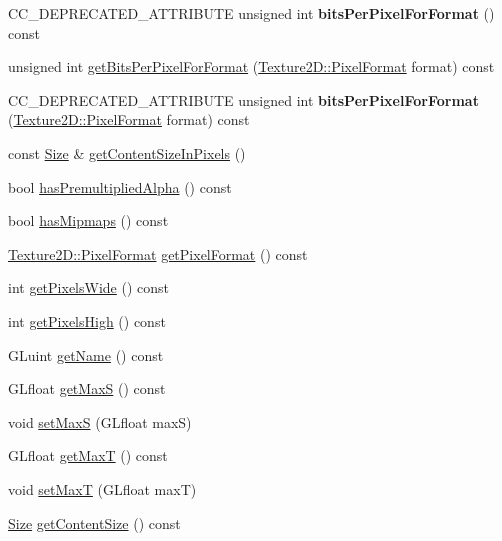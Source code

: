 \begin{DoxyCompactItemize}
C\+C\+\_\+\+D\+E\+P\+R\+E\+C\+A\+T\+E\+D\+\_\+\+A\+T\+T\+R\+I\+B\+U\+TE unsigned int {\bfseries bits\+Per\+Pixel\+For\+Format} () const
\item 
unsigned int \hyperlink{classTexture2D_ada259b363b6d48c23acfcc79db3d2a47}{get\+Bits\+Per\+Pixel\+For\+Format} (\hyperlink{classTexture2D_a45d9d8bb5a0669def36bbdfbfb91d220}{Texture2\+D\+::\+Pixel\+Format} format) const
\item 
\mbox{\label{classTexture2D_afe02fb3ca232889c58339125bf2e2e8e}} 
C\+C\+\_\+\+D\+E\+P\+R\+E\+C\+A\+T\+E\+D\+\_\+\+A\+T\+T\+R\+I\+B\+U\+TE unsigned int {\bfseries bits\+Per\+Pixel\+For\+Format} (\hyperlink{classTexture2D_a45d9d8bb5a0669def36bbdfbfb91d220}{Texture2\+D\+::\+Pixel\+Format} format) const
\item 
const \hyperlink{classSize}{Size} \& \hyperlink{classTexture2D_a827e7f2d58de577a63e62d3ed4f488cd}{get\+Content\+Size\+In\+Pixels} ()
\item 
bool \hyperlink{classTexture2D_aa1cc09ea8b7015cc2bf66a7847ee0990}{has\+Premultiplied\+Alpha} () const
\item 
bool \hyperlink{classTexture2D_a5a19e34a8e9f9192f81193f7bf8cdbc2}{has\+Mipmaps} () const
\item 
\hyperlink{classTexture2D_a45d9d8bb5a0669def36bbdfbfb91d220}{Texture2\+D\+::\+Pixel\+Format} \hyperlink{classTexture2D_a50abeeaa43511e402499c0e3c3c1ef22}{get\+Pixel\+Format} () const
\item 
int \hyperlink{classTexture2D_a87918e080c6edb84236e2438c055307b}{get\+Pixels\+Wide} () const
\item 
int \hyperlink{classTexture2D_a380681da07007b979df13ff7855312e5}{get\+Pixels\+High} () const
\item 
G\+Luint \hyperlink{classTexture2D_a2190dbf64d30302d1a3626a799a3504c}{get\+Name} () const
\item 
G\+Lfloat \hyperlink{classTexture2D_ac5d32187817ecac6e541ab5d41900b16}{get\+MaxS} () const
\item 
void \hyperlink{classTexture2D_afff3f3a59a2fec96d6a343a7e4c2ea97}{set\+MaxS} (G\+Lfloat maxS)
\item 
G\+Lfloat \hyperlink{classTexture2D_a1aca482857641c5f4d59afb90dd7ec9e}{get\+MaxT} () const
\item 
void \hyperlink{classTexture2D_add1529d1406a3a408bfaa68bd5af8693}{set\+MaxT} (G\+Lfloat maxT)
\item 
\hyperlink{classSize}{Size} \hyperlink{classTexture2D_a3ca89213245342676defce5f4124e36b}{get\+Content\+Size} () const

\end{DoxyCompactItemize}
